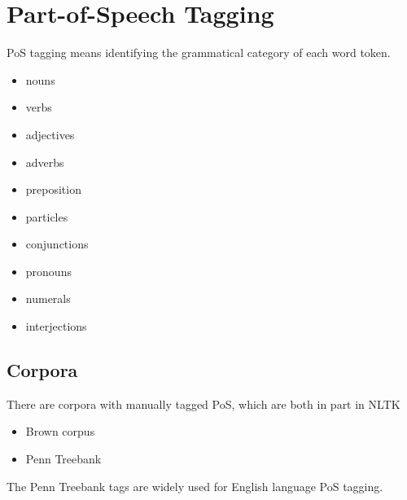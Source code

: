 \documentclass[11pt]{article}
\begin{document}
\section{Part-of-Speech Tagging}
PoS tagging means identifying the grammatical category of each word token.

\vspace{1em}
\noindent
\begin{minipage}{0.45\linewidth}
	\begin{itemize}
		\item nouns
		\item verbs
		\item adjectives
		\item adverbs
		\item preposition
	\end{itemize}
\end{minipage}
\begin{minipage}{0.45\linewidth}
	\begin{itemize}
		\item particles
		\item conjunctions
		\item pronouns
		\item numerals
		\item interjections
	\end{itemize}
\end{minipage}

\subsection{Corpora}
There are corpora with manually tagged PoS, which are both in part in NLTK
\begin{itemize}
	\item Brown corpus
	\item Penn Treebank
\end{itemize}
The Penn Treebank tags are widely used for English language PoS tagging.
\end{document}
